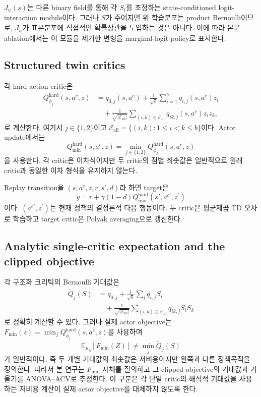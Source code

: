 \documentclass[10pt,journal]{IEEEtran}
\newcommand{\E}{\mathbb{E}}
\begin{document}
$J_\psi(s)$는 다른 binary field를 통해 각 $S_i$를 조정하는 state-conditioned logit-interaction module이다. 그러나 $S$가 주어지면 위 학습분포는 product Bernoulli이므로, $J_\psi$가 표본분포에 직접적인 확률상관을 도입하는 것은 아니다. 이에 따라 본문 ablation에서는 이 모듈을 제거한 변형을 marginal-logit policy로 표시한다.

\subsection{Structured twin critics}

각 hard-action critic은
\begin{align}
Q_{\phi_j}^{\mathrm{hard}}(s,a^c,z)
&=q_{0,j}(s,a^c)+\frac{1}{\sqrt b}\sum_{i=1}^{b}q_{i,j}(s,a^c)z_i
\nonumber\\
&\quad+\frac{1}{\sqrt{|\mathcal E_{\mathrm{all}}|}}
\sum_{(i,k)\in\mathcal E_{\mathrm{all}}}q_{ik,j}(s,a^c)z_i z_k,
\label{eq:supp-critic}
\end{align}
로 계산한다. 여기서 $j\in\{1,2\}$이고
$\mathcal E_{\mathrm{all}}=\{(i,k):1\leq i<k\leq b\}$이다. Actor update에서는
\begin{equation}
Q_{\min}^{\mathrm{hard}}(s,a^c,z)
=\min_{j\in\{1,2\}}Q_{\phi_j}^{\mathrm{hard}}(s,a^c,z)
\label{eq:supp-qmin}
\end{equation}
을 사용한다. 각 critic은 이차식이지만 두 critic의 점별 최솟값은 일반적으로 원래 critic과 동일한 이차 형식을 유지하지 않는다.

Replay transition을 $(s,a^c,z,r,s',d)$라 하면 target은
\begin{equation}
y=r+\gamma(1-d)Q_{\min}^{\mathrm{hard}}(s',a^{c\prime},z^{\prime})
\end{equation}
이다. $(a^{c\prime},z^{\prime})$는 현재 정책의 결정론적 다음 행동이다. 두 critic은 평균제곱 TD 오차로 학습하고 target critic은 Polyak averaging으로 갱신한다.

\subsection{Analytic single-critic expectation and the clipped objective}

각 구조화 크리틱의 Bernoulli 기대값은
\begin{align}
\widetilde Q_j(S)
&=q_{0,j}+\frac{1}{\sqrt b}\sum_iq_{i,j}S_i
\nonumber\\
&\quad+\frac{1}{\sqrt{|\mathcal E_{\mathrm{all}}|}}
\sum_{(i,k)\in\mathcal E_{\mathrm{all}}}q_{ik,j}S_iS_k
\label{eq:supp-single-analytic}
\end{align}
로 정확히 계산할 수 있다. 그러나 실제 actor objective는
$F_{\min}(z)=\min_jQ_{\phi_j}^{\mathrm{hard}}(s,a^c,z)$를 사용하며
\begin{equation}
\E_{\mu_S}[F_{\min}(Z)]
\neq\min_j\widetilde Q_j(S)
\label{eq:supp-min-gap}
\end{equation}
가 일반적이다. 즉 두 개별 기대값의 최솟값은 저비용이지만 왼쪽과 다른 정책목적을 정의한다. 따라서 본 연구는 $F_{\min}$ 자체를 질의하고 그 clipped objective의 기대값과 기울기를 ANOVA--ACV로 추정한다. 이 구분은 각 단일 critic의 해석적 기대값을 사용하는 저비용 계산이 실제 actor objective를 대체하지 않도록 한다.
\end{document}
